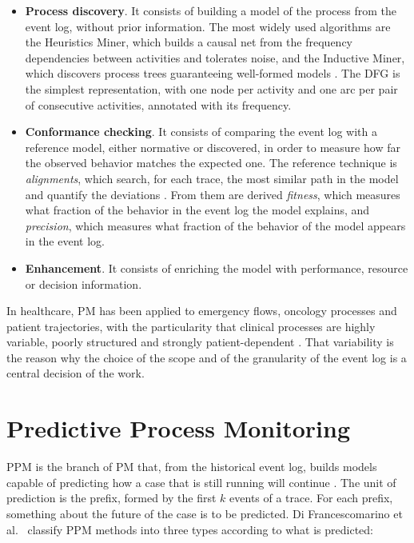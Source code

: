 \begin{itemize}[leftmargin=*]
  \item \textbf{Process discovery}. It consists of building a model of the process from the event log, without prior information. The most widely used algorithms are the Heuristics Miner, which builds a causal net from the frequency dependencies between activities and tolerates noise, and the Inductive Miner, which discovers process trees guaranteeing well-formed models \cite{leemans2014}. The DFG is the simplest representation, with one node per activity and one arc per pair of consecutive activities, annotated with its frequency.
  \item \textbf{Conformance checking}. It consists of comparing the event log with a reference model, either normative or discovered, in order to measure how far the observed behavior matches the expected one. The reference technique is \emph{alignments}, which search, for each trace, the most similar path in the model and quantify the deviations \cite{carmona2018}. From them are derived \emph{fitness}, which measures what fraction of the behavior in the event log the model explains, and \emph{precision}, which measures what fraction of the behavior of the model appears in the event log.
  \item \textbf{Enhancement}. It consists of enriching the model with performance, resource or decision information.
\end{itemize}

In healthcare, PM has been applied to emergency flows, oncology processes and patient trajectories, with the particularity that clinical processes are highly variable, poorly structured and strongly patient-dependent \cite{munoz2022}. That variability is the reason why the choice of the scope and of the granularity of the event log is a central decision of the work.

\section{Predictive Process Monitoring}
\label{sec:ppm}

PPM is the branch of PM that, from the historical event log, builds models capable of predicting how a case that is still running will continue \cite{difrancescomarino2022}. The unit of prediction is the prefix, formed by the first $k$ events of a trace. For each prefix, something about the future of the case is to be predicted. Di Francescomarino et al.\ \cite{difrancescomarino2018} classify PPM methods into three types according to what is predicted:

